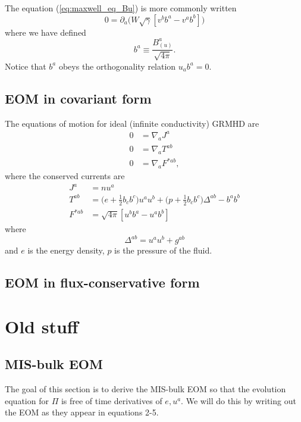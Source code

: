 \documentclass[12pt]{article}
\numberwithin{equation}{section}
\begin{document}
The equation (\ref{eq:maxwell_eq_Bu}) is more commonly written
\begin{equation}
0 = \partial_{a} \Big( W \sqrt{\gamma} [v^b b^{a} - v^a b^{b}] \Big)
\end{equation}
where we have defined
\begin{equation} \label{eq:ba}
b^{a} \equiv \frac{B^{a}_{(u)}}{\sqrt{4 \pi}}.
\end{equation}
Notice that $b^a$ obeys the orthogonality relation $u_a b^a = 0$.

\subsection{EOM in covariant form}

The equations of motion for ideal (infinite conductivity) GRMHD are
\begin{align}
0 &= \nabla_{a} J^{a}    \\
0 &= \nabla_{a} T^{ab}   \\
0 &= \nabla_{a} F^{*ab},
\end{align}
where the conserved currents are
\begin{align}
J^{a} &= n u^a \\
T^{ab} &= \Big( e + \frac{1}{2} b_c b^c \Big) u^a u^b + \Big( p + \frac{1}{2} b_c b^c \Big) \Delta^{ab} - b^a b^b  \\
F^{*ab} &= \sqrt{4 \pi} [u^b b^{a} - u^a b^{b}]
\end{align}
where
\begin{equation}
\Delta^{ab} = u^a u^b + g^{ab}
\end{equation}
and $e$ is the energy density, $p$ is the pressure of the fluid.

\subsection{EOM in flux-conservative form}

\section{Old stuff}

\subsection{MIS-bulk EOM}

The goal of this section is to derive the MIS-bulk EOM so that the evolution equation for $\Pi$ is free of time derivatives of $e, u^a$.
We will do this by writing out the EOM as they appear in \cite{Bemfica19} equations 2-5.
\end{document}
